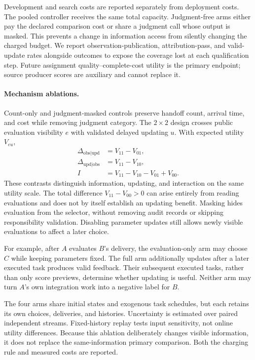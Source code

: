 \documentclass[sigconf,anonymous]{aamas}
\begin{document}
Development and search costs are reported separately from deployment costs. The pooled controller receives the same total capacity. Judgment-free arms either pay the declared comparison cost or share a judgment call whose output is masked. This prevents a change in information access from silently changing the charged budget. We report observation-publication, attribution-pass, and valid-update rates alongside outcomes to expose the coverage lost at each qualification step. Future assignment quality--complete-cost utility is the primary endpoint; source producer scores are auxiliary and cannot replace it.

\paragraph{Mechanism ablations.} Count-only and judgment-masked controls preserve handoff count, arrival time, and cost while removing judgment category. The $2\times2$ design crosses public evaluation visibility $e$ with validated delayed updating $u$. With expected utility $V_{eu}$,
\begin{equation}
\begin{aligned}
 \Delta_{\mathrm{obs}|\mathrm{upd}}&=V_{11}-V_{01},\\
 \Delta_{\mathrm{upd}|\mathrm{obs}}&=V_{11}-V_{10},\\
 I&=V_{11}-V_{10}-V_{01}+V_{00}.
\end{aligned}
\label{eq:factorial}
\end{equation}
These contrasts distinguish information, updating, and interaction on the same utility scale. The total difference $V_{11}-V_{00}>0$ can arise entirely from reading evaluations and does not by itself establish an updating benefit. Masking hides evaluation from the selector, without removing audit records or skipping responsibility validation. Disabling parameter updates still allows newly visible evaluations to affect a later choice.

For example, after $A$ evaluates $B$'s delivery, the evaluation-only arm may choose $C$ while keeping parameters fixed. The full arm additionally updates after a later executed task produces valid feedback. Their subsequent executed tasks, rather than only score previews, determine whether updating is useful. Neither arm may turn $A$'s own integration work into a negative label for $B$.

The four arms share initial states and exogenous task schedules, but each retains its own choices, deliveries, and histories. Uncertainty is estimated over paired independent streams. Fixed-history replay tests input sensitivity, not online utility differences. Because this ablation deliberately changes visible information, it does not replace the same-information primary comparison. Both the charging rule and measured costs are reported.
\end{document}
